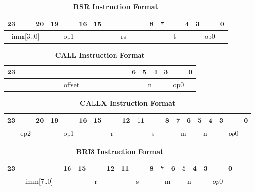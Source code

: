 \begin{table}[H]
	\caption{\textbf{RSR Instruction Format}}
	\begin{tabular}{llllllllllllllllllllllll}
		23 & & & 20 & 19 & & & 16 & 15 & & & & & & & 8 & 7 & & & 4 & 3 & & & 0 \\
		\hline
		\multicolumn{4}{|c|}{imm[3..0]} & \multicolumn{4}{c|}{op1} &\multicolumn{8}{c|}{rs} & \multicolumn{4}{c|}{t} & \multicolumn{4}{c|}{op0}\\
		\hline
	\end{tabular}
\end{table}

\begin{table}[H]
	\caption{\textbf{CALL Instruction Format}}
	\begin{tabular}{llllllllllllllllllllllll}
		23 & & & & & & & & & & & & & & & & & 6 & 5 & 4 & 3 & & & 0 \\
		\hline
		\multicolumn{18}{|c|}{offset} & \multicolumn{2}{c|}{n} & \multicolumn{4}{c|}{op0}\\
		\hline
	\end{tabular}
\end{table}

\begin{table}[H]
	\caption{\textbf{CALLX Instruction Format}}
	\begin{tabular}{llllllllllllllllllllllll}
		23 & & & 20 & 19 & & & 16 & 15 & & & 12 & 11 & & & 8 & 7 & 6 & 5 & 4 & 3 & & & 0 \\
		\hline
		\multicolumn{4}{|c|}{op2} & \multicolumn{4}{c|}{op1} & \multicolumn{4}{c|}{r} & \multicolumn{4}{c|}{s} & \multicolumn{2}{c|}{m} & \multicolumn{2}{c|}{n} & \multicolumn{4}{c|}{$op0$}\\
		\hline
	\end{tabular}
\end{table}

\begin{table}[H]
	\caption{\textbf{BRI8 Instruction Format}}
	\begin{tabular}{llllllllllllllllllllllll}
		23 & & & & & & & 16 & 15 & & & 12 & 11 & & & 8 & 7 & 6 & 5 & 4 & 3 & & & 0 \\
		\hline
		\multicolumn{8}{|c|}{imm[7..0]} & \multicolumn{4}{c|}{r} & \multicolumn{4}{c|}{s} & \multicolumn{2}{c|}{m} & \multicolumn{2}{c|}{n} & \multicolumn{4}{c|}{$op0$}\\
		\hline
	\end{tabular}
\end{table}


